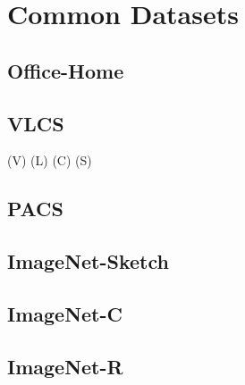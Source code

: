 \section{Common Datasets}

\subsection{Office-Home}
\citet{VenkateswaraECP17}

\subsection{VLCS}

(V) \citet{EveringhamGWWZ10} (L) \citet{RussellTMF08} (C) \citet{Griffin2007Caltech256OC} (S) \citet{ChoiLTW10}

\subsection{PACS}
\citet{LiYSH17}

\subsection{ImageNet-Sketch}
\citet{WangGLX19}


\subsection{ImageNet-C}
\citet{HendrycksD19}

\subsection{ImageNet-R}
\citet{hendrycks2020faces}








